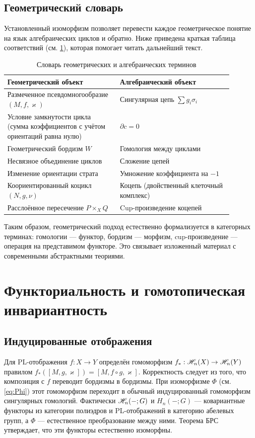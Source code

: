 \documentclass[12pt, twoside]{article}
\begin{document}
\subsection{Геометрический словарь}

Установленный изоморфизм позволяет перевести каждое геометрическое понятие на язык алгебраических циклов и обратно. Ниже приведена краткая таблица соответствий (см. \cref{tab:dict}), которая помогает читать дальнейший текст.

\begin{table}[htbp]
\centering
\begin{tabular}{p{0.45\linewidth}|p{0.45\linewidth}}
\textbf{Геометрический объект} & \textbf{Алгебраический объект} \\ \hline
Размеченное псевдомногообразие $(M,f,\varkappa)$ & Сингулярная цепь $\sum g_i \sigma_i$ \\
Условие замкнутости цикла (сумма коэффициентов с учётом ориентаций равна нулю) & $\partial c = 0$ \\
Геометрический бордизм $W$ & Гомология между циклами \\
Несвязное объединение циклов & Сложение цепей \\
Изменение ориентации страта & Умножение коэффициента на $-1$ \\
Коориентированный коцикл $(N,g,\nu)$ & Коцепь (двойственный клеточный комплекс) \\
Расслоённое пересечение $P \times_X Q$ & Cup-произведение коцепей
\end{tabular}
\caption{Словарь геометрических и алгебраических терминов}
\label{tab:dict}
\end{table}

Таким образом, геометрический подход естественно формализуется в категорных терминах: гомологии — функтор, бордизм — морфизм, cup-произведение — операция на представимом функторе. Это связывает изложенный материал с современными абстрактными теориями.

\section{Функториальность и гомотопическая инвариантность}

\subsection{Индуцированные отображения}

Для PL-отображения $f: X \to Y$ определён гомоморфизм $f_*: \mathscr{H}_n(X) \to \mathscr{H}_n(Y)$ правилом $f_*([M,g,\varkappa]) = [M, f \circ g, \varkappa]$. Корректность следует из того, что композиция с $f$ переводит бордизмы в бордизмы. При изоморфизме $\Phi$ (см. \cref{eq:Phi}) этот гомоморфизм переходит в обычный индуцированный гомоморфизм сингулярных гомологий. Фактически $\mathscr{H}_n(-;G)$ и $H_n(-;G)$ — ковариантные функторы из категории полиэдров и PL-отображений в категорию абелевых групп, а $\Phi$ — естественное преобразование между ними. Теорема БРС утверждает, что эти функторы естественно изоморфны.
\end{document}
